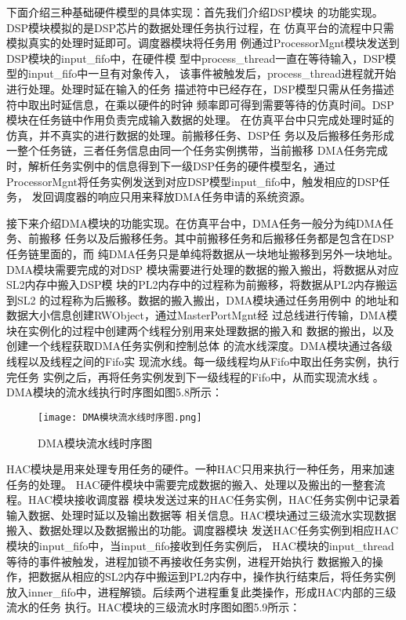 下面介绍三种基础硬件模型的具体实现：首先我们介绍DSP模块
的功能实现。DSP模块模拟的是DSP芯片的数据处理任务执行过程，在
仿真平台的流程中只需模拟真实的处理时延即可。调度器模块将任务用
例通过ProcessorMgnt模块发送到DSP模块的input\_fifo中，在硬件模
型中process\_thread一直在等待输入，DSP模型的input\_fifo中一旦有对象传入，
该事件被触发后，process\_thread进程就开始进行处理。处理时延在输入的任务
描述符中已经存在，DSP模型只需从任务描述符中取出时延信息，在乘以硬件的时钟
频率即可得到需要等待的仿真时间。DSP模块在任务链中作用负责完成输入数据的处理。
在仿真平台中只完成处理时延的仿真，并不真实的进行数据的处理。前搬移任务、DSP任
务以及后搬移任务形成一整个任务链，三者任务信息由同一个任务实例携带，当前搬移
DMA任务完成时，解析任务实例中的信息得到下一级DSP任务的硬件模型名，通过
ProcessorMgnt将任务实例发送到对应DSP模型input\_fifo中，触发相应的DSP任务，
发回调度器的响应只用来释放DMA任务申请的系统资源。

接下来介绍DMA模块的功能实现。在仿真平台中，DMA任务一般分为纯DMA任务、前搬移
任务以及后搬移任务。其中前搬移任务和后搬移任务都是包含在DSP任务链里面的，而
纯DMA任务只是单纯将数据从一块地址搬移到另外一块地址。DMA模块需要完成的对DSP
模块需要进行处理的数据的搬入搬出，将数据从对应SL2内存中搬入DSP模
块的PL2内存中的过程称为前搬移，将数据从PL2内存搬运到SL2
的过程称为后搬移。数据的搬入搬出，DMA模块通过任务用例中
的地址和数据大小信息创建RWObject，通过MasterPortMgnt经
过总线进行传输，DMA模块在实例化的过程中创建两个线程分别用来处理数据的搬入和
数据的搬出，以及创建一个线程获取DMA任务实例和控制总体
的流水线深度。DMA模块通过各级线程以及线程之间的Fifo实
现流水线。每一级线程均从Fifo中取出任务实例，执行完任务
实例之后，再将任务实例发到下一级线程的Fifo中，从而实现流水线
。DMA模块的流水线执行时序图如图5.8所示：

\begin{figure}
    \centering
    \texttt{[image: DMA模块流水线时序图.png]}
    \caption{DMA模块流水线时序图}
    \label{fig:badge}
\end{figure}


HAC模块是用来处理专用任务的硬件。一种HAC只用来执行一种任务，用来加速任务的处理。
HAC硬件模块中需要完成数据的搬入、处理以及搬出的一整套流程。HAC模块接收调度器
模块发送过来的HAC任务实例，HAC任务实例中记录着输入数据、处理时延以及输出数据等
相关信息。HAC模块通过三级流水实现数据搬入、数据处理以及数据搬出的功能。调度器模块
发送HAC任务实例到相应HAC模块的input\_fifo中，当input\_fifo接收到任务实例后，
HAC模块的input\_thread等待的事件被触发，进程加锁不再接收任务实例，进程开始执行
数据搬入的操作，把数据从相应的SL2内存中搬运到PL2内存中，操作执行结束后，将任务实例
放入inner\_fifo中，进程解锁。后续两个进程重复此类操作，形成HAC内部的三级流水的任务
执行。HAC模块的三级流水时序图如图5.9所示：

